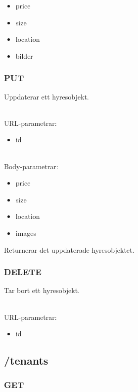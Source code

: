 \documentclass{article}
\begin{document}
\begin{itemize}
    \item price
    \item size
    \item location
    \item bilder
\end{itemize}

\subsubsection {PUT}
\label{ssub:PUT}

Uppdaterar ett hyresobjekt.

\\URL-parametrar:

\begin{itemize}
    \item id
\end{itemize}

\\Body-parametrar:

\begin{itemize}
    \item price
    \item size
    \item location
    \item images 
\end{itemize}

Returnerar det uppdaterade hyresobjektet.

\subsubsection {DELETE}
\label{ssub:DELETE}

Tar bort ett hyresobjekt.

\\URL-parametrar:

\begin{itemize}
    \item id
\end{itemize}

\subsection {/tenants}
\label{sub:/tenants}

\subsubsection {GET}
\label{ssub:GET}
\end{document}
